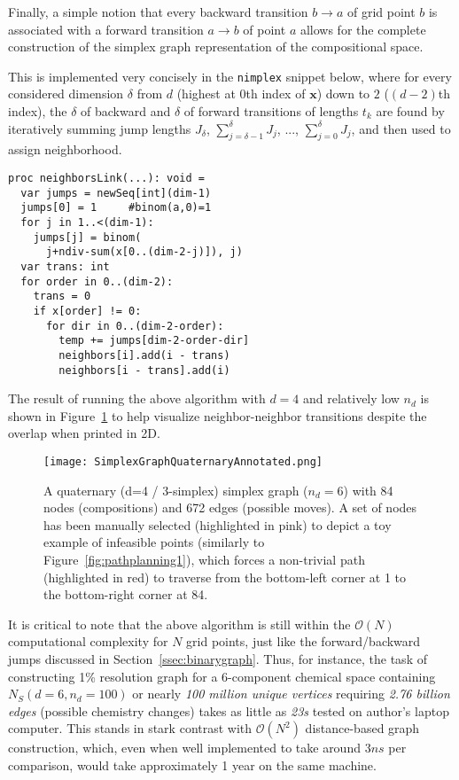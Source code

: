 Finally, a simple notion that every backward transition $b \rightarrow a$ of grid point $b$ is associated with a forward transition $a \rightarrow b$ of point $a$ allows for the complete construction of the simplex graph representation of the compositional space.

This is implemented very concisely in the \texttt{nimplex} snippet below, where for every considered dimension $\delta$ from $d$ (highest at $0$th index of $\textbf{x}$) down to $2$ ($(d-2)$th index), the $\delta$ of backward and $\delta$ of forward transitions of lengths $t_k$ are found by iteratively summing jump lengths $J_{\delta}$, $\sum_{j=\delta-1}^{\delta}J_j$, ..., $\sum_{j=0}^{\delta}J_j$, and then used to assign neighborhood.

\begin{verbatim}
proc neighborsLink(...): void =
  var jumps = newSeq[int](dim-1)
  jumps[0] = 1     #binom(a,0)=1
  for j in 1..<(dim-1):
    jumps[j] = binom(
      j+ndiv-sum(x[0..(dim-2-j)]), j)
  var trans: int
  for order in 0..(dim-2): 
    trans = 0
    if x[order] != 0:
      for dir in 0..(dim-2-order): 
        temp += jumps[dim-2-order-dir]
        neighbors[i].add(i - trans)
        neighbors[i - trans].add(i)           
\end{verbatim}

The result of running the above algorithm with $d=4$ and relatively low $n_d$ is shown in Figure~\ref{fig:quaternarysimplexgraph} to help visualize neighbor-neighbor transitions despite the overlap when printed in 2D.

\begin{figure}[h]
    \centering
    \texttt{[image: SimplexGraphQuaternaryAnnotated.png]}
    \caption{A quaternary (d=4 / 3-simplex) simplex graph ($n_d=6$) with 84 nodes (compositions) and 672 edges (possible moves). A set of nodes has been manually selected (highlighted in pink) to depict a toy example of infeasible points (similarly to Figure~\ref{fig:pathplanning1}), which forces a non-trivial path (highlighted in red) to traverse from the bottom-left corner at 1 to the bottom-right corner at 84.} 
    \label{fig:quaternarysimplexgraph}
\end{figure}

It is critical to note that the above algorithm is still within the $\mathcal{O}(N)$ computational complexity for $N$ grid points, just like the forward/backward jumps discussed in Section~\ref{ssec:binarygraph}. Thus, for instance, the task of constructing 1\% resolution graph for a 6-component chemical space containing $N_S(d=6, n_d=100)$ or nearly \textit{100 million unique vertices} requiring \textit{2.76 billion edges} (possible chemistry changes) takes as little as \textit{23s} tested on author's laptop computer. This stands in stark contrast with $\mathcal{O}(N^2)$ distance-based graph construction, which, even when well implemented to take around $3ns$ per comparison, would take approximately 1 year on the same machine.

